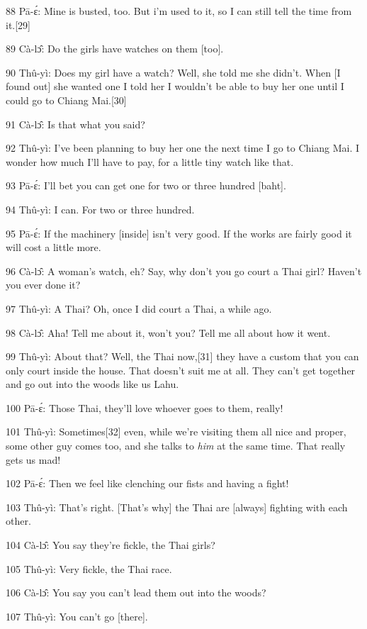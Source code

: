 {88 Pā-ɛ́: Mine is busted, too. But i'm used to it, so I can still tell
the time from it.[29]}

{89 Cà-lɔ̂: Do the girls have watches on them [too].}

{90 Thû-yì: Does my girl have a watch? Well, she told me she didn't. When
[I found out] she wanted one I told her I wouldn't be able to buy her one until
I could go to Chiang Mai.[30]}

{91 Cà-lɔ̂: Is that what you said?}

{92 Thû-yì: I've been planning to buy her one the next time I go to Chiang
Mai. I wonder how much I'll have to pay, for a little tiny watch like that.}

{93 Pā-ɛ́: I'll bet you can get one for two or three hundred [baht].}

{94 Thû-yì: I can. For two or three hundred.}

{95 Pā-ɛ́: If the machinery [inside] isn't very good. If the works are
fairly good it will cost a little more.}

{96 Cà-lɔ̂: A woman's watch, eh? Say, why don't you go court a Thai girl?
Haven't you ever done it?}

{97 Thû-yì: A Thai? Oh, once I did court a Thai, a while ago.}

{98 Cà-lɔ̂: Aha! Tell me about it, won't you? Tell me all about how it
went.}

{99 Thû-yì: About that? Well, the Thai now,[31] they have a custom that
you can only court inside the house. That doesn't suit me at all. They can't get
together and go out into the woods like us Lahu. }

{100 Pā-ɛ́: Those Thai, they'll love whoever goes to them, really!}

{101 Thû-yì: Sometimes[32] even, while we're visiting them all nice and
proper, some other guy comes too, and she talks to }{\textit{him}}{
at the same time. That really gets us mad!}

{102 Pā-ɛ́: Then we feel like clenching our fists and having a fight!}

{103 Thû-yì: That's right. [That's why] the Thai are [always] fighting
with each other.}

{104 Cà-lɔ̂: You say they're fickle, the Thai girls?}

{105 Thû-yì: Very fickle, the Thai race.}

{106 Cà-lɔ̂: You say you can't lead them out into the woods?}

{107 Thû-yì: You can't go [there].}

